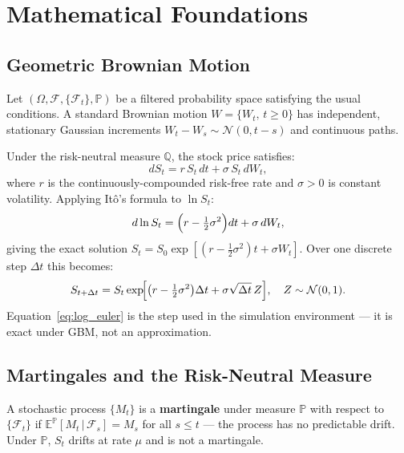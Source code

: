 \documentclass[12pt,a4paper]{article}
\begin{document}
\section{Mathematical Foundations}
\label{sec:math}

\subsection{Geometric Brownian Motion}

Let $(\Omega, \mathcal{F}, \{\mathcal{F}_t\}, \mathbb{P})$ be a filtered
probability space satisfying the usual conditions.  A standard Brownian motion
$W = \{W_t,\,t\ge 0\}$ has independent, stationary Gaussian increments
$W_t - W_s \sim \mathcal{N}(0,t-s)$ and continuous paths.

Under the risk-neutral measure $\mathbb{Q}$, the stock price satisfies:
\begin{equation}
  dS_t = r\,S_t\,dt + \sigma\,S_t\,dW_t,
  \label{eq:gbm}
\end{equation}
where $r$ is the continuously-compounded risk-free rate and $\sigma>0$ is
constant volatility.  Applying It\^{o}'s formula to $\ln S_t$:
\begin{equation}
  d\ln S_t = \Bigl(r - \tfrac{1}{2}\sigma^2\Bigr)dt + \sigma\,dW_t,
  \label{eq:logS}
\end{equation}
giving the exact solution $S_t = S_0\exp[(r-\tfrac12\sigma^2)t + \sigma W_t]$.
Over one discrete step $\Delta t$ this becomes:
\begin{equation}
  S_{t+\Delta t} = S_t\exp\!\Bigl[\bigl(r-\tfrac12\sigma^2\bigr)\Delta t
                  + \sigma\sqrt{\Delta t}\,Z\Bigr],
  \quad Z\sim\mathcal{N}(0,1).
  \label{eq:log_euler}
\end{equation}
Equation~\eqref{eq:log_euler} is the step used in the simulation environment ---
it is exact under GBM, not an approximation.

\subsection{Martingales and the Risk-Neutral Measure}
\label{sec:martingale}

A stochastic process $\{M_t\}$ is a \textbf{martingale} under measure
$\mathbb{P}$ with respect to $\{\mathcal{F}_t\}$ if
$\mathbb{E}^\mathbb{P}[M_t\,|\,\mathcal{F}_s] = M_s$ for all $s \le t$ ---
the process has no predictable drift.  Under $\mathbb{P}$, $S_t$ drifts at
rate $\mu$ and is not a martingale.
\end{document}
